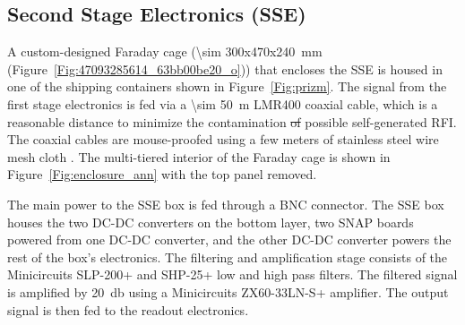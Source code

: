 \subsection{Second Stage Electronics (SSE)}

A custom-designed Faraday cage (\SI{\sim 300x470x240}{\milli \meter}  (Figure~\ref{Fig:47093285614_63bb00be20_o})) that encloses the SSE is housed in one of the shipping containers shown in Figure~\ref{Fig:prizm}. The signal from the first stage electronics is fed via a \SI{\sim 50}{\meter} LMR400 coaxial cable, which is a reasonable distance to minimize the contamination \st{of}  possible self-generated RFI. The coaxial cables are mouse-proofed using a few meters of stainless steel wire mesh cloth . The multi-tiered interior of the Faraday cage is shown in Figure~\ref{Fig:enclosure_ann} with the top panel removed. 

The main power to the SSE box is fed through a BNC connector. The SSE box houses the two DC-DC converters on the bottom layer, two SNAP boards powered from one DC-DC converter, and the other DC-DC converter powers the rest of the box's electronics.  The filtering and amplification stage consists of the Minicircuits SLP-200+ and SHP-25+ low and high pass filters. The filtered signal is amplified by \SI{20}{\decibel} using a Minicircuits ZX60-33LN-S+ amplifier. The output signal is then fed to the readout electronics.  

